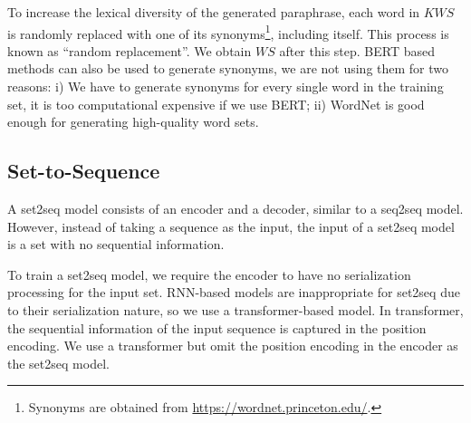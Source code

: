To increase the lexical diversity of the generated paraphrase,
each word in $KWS$ is randomly replaced with one of its synonyms\footnote{Synonyms 
are obtained from \url{https://wordnet.princeton.edu/}.}, including itself. This process is known as ``random replacement''. We obtain $WS$ after this step. 
BERT based methods can also be used to generate synonyms, 
we are not using them for two reasons: i) We have to generate synonyms 
for every single word in the training set, it is too computational expensive 
if we use BERT; ii) WordNet is good enough for generating high-quality 
word sets.


\subsection{Set-to-Sequence} \label{sec:set2seq}
A set2seq model consists of an encoder and a decoder, similar to a seq2seq model. However, instead of taking a sequence as the input, the input of a set2seq model is a set with no sequential information.

To train a set2seq model, we require the encoder to have no serialization processing for the input set. RNN-based models are inappropriate for set2seq due to their serialization nature, so we use a transformer-based model. In transformer, the sequential information of the input sequence is captured in the position encoding. We use a transformer but omit the position encoding in the encoder as the set2seq model.


